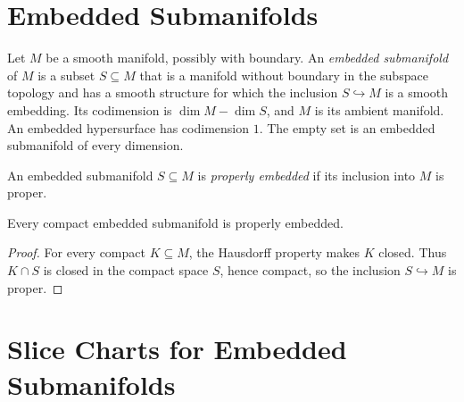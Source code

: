 

\section{Embedded Submanifolds}

\begin{definition}
\label{def:5-28-extra-1}
\leanok
Let $M$ be a smooth manifold, possibly with boundary. An \emph{embedded
submanifold} of $M$ is a subset $S\subseteq M$ that is a manifold without
boundary in the subspace topology and has a smooth structure for which the
inclusion $S\hookrightarrow M$ is a smooth embedding. Its codimension is
$\dim M-\dim S$, and $M$ is its ambient manifold. An embedded hypersurface has
codimension $1$. The empty set is an embedded submanifold of every dimension.
\end{definition}

\begin{definition}
\label{def:5-28-extra-2}
\leanok
An embedded submanifold $S\subseteq M$ is \emph{properly embedded} if its
inclusion into $M$ is proper.
\end{definition}

\begin{corollary}
\label{cor:5-6}
\leanok
{}
Every compact embedded submanifold is properly embedded.
\end{corollary}

\begin{proof}
\leanok
For every compact $K\subseteq M$, the Hausdorff property makes $K$ closed.
Thus $K\cap S$ is closed in the compact space $S$, hence compact, so the
inclusion $S\hookrightarrow M$ is proper.
\end{proof}


\section{Slice Charts for Embedded Submanifolds}

